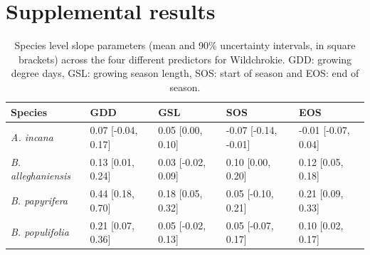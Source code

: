 \documentclass{article}\usepackage[]{graphicx}\usepackage[]{xcolor}
\begin{document}
\clearpage
\section*{Supplemental results}

\setcounter{table}{0}
\renewcommand{\thetable}{S\arabic{table}}
\setcounter{figure}{0}
\renewcommand{\thefigure}{S\arabic{figure}}

\begin{table}[ht]
\centering
\caption{Species level slope parameters (mean and 90\% uncertainty intervals, in square brackets) across the four different predictors for Wildchrokie. GDD: growing degree days, GSL: growing season length, SOS: start of season and EOS: end of season.} 
\label{tab:wc_slope_table}
\begin{tabular}{lllll}
  \hline
Species & GDD & GSL & SOS & EOS \\ 
  \hline
\textit{A. incana} & 0.07 [-0.04, 0.17] & 0.05 [0.00, 0.10] & -0.07 [-0.14, -0.01] & -0.01 [-0.07, 0.04] \\ 
  \textit{B. alleghaniensis} & 0.13 [0.01, 0.24] & 0.03 [-0.02, 0.09] & 0.10 [0.00, 0.20] & 0.12 [0.05, 0.18] \\ 
  \textit{B. papyrifera} & 0.44 [0.18, 0.70] & 0.18 [0.05, 0.32] & 0.05 [-0.10, 0.21] & 0.21 [0.09, 0.33] \\ 
  \textit{B. populifolia} & 0.21 [0.07, 0.36] & 0.05 [-0.02, 0.13] & 0.05 [-0.07, 0.17] & 0.10 [0.02, 0.17] \\ 
   \hline
\end{tabular}
\end{table}
\end{document}
